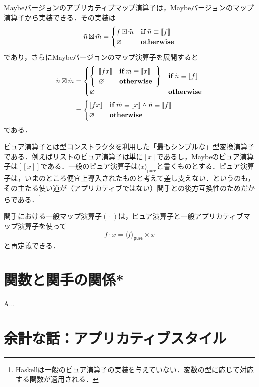 \documentclass[twocolumn]{jsbook}
\def\[{[\![}
\def\]{]\!]}
\DeclareMathOperator{\hsklApplicativeMap}{\times}
\DeclareMathOperator{\hsklApplicativeMaybeMap}{\boxtimes}
\DeclareMathOperator{\hsklFmap}{\cdot}
\DeclareMathOperator{\hsklMaybeMap}{\boxdot}
\newcommand{\hsklNothing}{\varnothing}
\newcommand{\hsklJust}[1]{\[#1\]}
\newcommand{\hsklMaybe}[1]{\Tilde{#1}}
\newcommand{\hsklPure}[1]{\langle#1\rangle_\textsf{pure}}
\newcommand{\mathKeyword}[1]{\mathbf{#1}}
\DeclareMathOperator{\mathIf}{\mathKeyword{if}}
\newcommand{\mathOtherwise}{\mathKeyword{otherwise}}
\begin{document}
Maybeバージョンのアプリカティブマップ演算子は，Maybeバージョンのマップ演算子から実装できる．その実装は
\begin{equation*}
\hsklMaybe{n}\hsklApplicativeMaybeMap\hsklMaybe{m}=\begin{cases}
f\hsklMaybeMap\hsklMaybe{m}&\mathIf\hsklMaybe{n}\equiv\hsklJust{f}\\
\hsklNothing&\mathOtherwise
\end{cases}
\end{equation*}
であり，さらにMaybeバージョンのマップ演算子を展開すると
\begin{align*}
\hsklMaybe{n}\hsklApplicativeMaybeMap\hsklMaybe{m}&=\begin{cases}
\left\{
\begin{array}{ll}
\hsklJust{fx}&\mathIf\hsklMaybe{m}\equiv\hsklJust{x}\\
\hsklNothing&\mathOtherwise
\end{array}\right\}&\mathIf\hsklMaybe{n}\equiv\hsklJust{f}\\
\hsklNothing&\mathOtherwise
\end{cases}\\
&=\begin{cases}
\hsklJust{fx}&\mathIf\hsklMaybe{m}\equiv\hsklJust{x}\wedge\hsklMaybe{n}\equiv\hsklJust{f}\\
\hsklNothing&\mathOtherwise
\end{cases}
\end{align*}
である．

ピュア演算子とは型コンストラクタを利用した「最もシンプルな」型変換演算子である．例えばリストのピュア演算子は単に$[x]$であるし，Maybeのピュア演算子は$\hsklJust{x}$である．一般のピュア演算子は$\hsklPure{x}$と書くものとする．ピュア演算子は，いまのところ便宜上導入されたものと考えて差し支えない．というのも，その主たる使い道が（アプリカティブではない）関手との後方互換性のためだからである．\footnote{Haskellは一般のピュア演算子の実装を与えていない．変数の型に応じて対応する関数が適用される．}

関手における一般マップ演算子$(\hsklFmap)$は，ピュア演算子と一般アプリカティブマップ演算子を使って$$f\hsklFmap x=\hsklPure{f}\hsklApplicativeMap x$$と再定義できる．

\section{関数と関手の関係*}

A...

\section{余計な話：アプリカティブスタイル}
\end{document}
